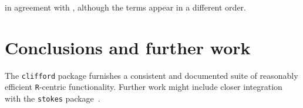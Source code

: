 \documentclass{article}
\begin{document}
in agreement with \cite{ablamowicz2012}, although the terms appear in
a different order.

\section{Conclusions and further work}

The {\tt clifford} package furnishes a consistent and documented suite
of reasonably efficient {\tt R}-centric functionality.  Further
work might include closer integration with the {\tt stokes}
package~\citep{hankin2019}.


 


\end{document}
